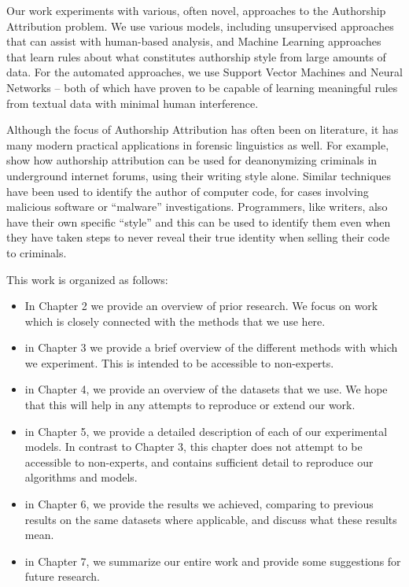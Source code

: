 Our work experiments with various, often novel, approaches to the Authorship Attribution problem. We use various models, including unsupervised approaches that can assist with human-based analysis, and Machine Learning approaches that learn rules about what constitutes authorship style from large amounts of data. For the automated approaches, we use Support Vector Machines and Neural Networks -- both of which have proven to be capable of learning meaningful rules from textual data with minimal human interference. 

Although the focus of Authorship Attribution has often been on literature, it has many modern practical applications in forensic linguistics as well. For example, \citet{afroz2014doppelganger} show how authorship attribution can be used for deanonymizing criminals in underground internet forums, using their writing style alone. Similar techniques have been used to identify the author of computer code, for cases involving malicious software or ``malware'' investigations. Programmers, like writers, also have their own specific ``style'' and this can be used to identify them even when they have taken steps to never reveal their true identity when selling their code to criminals.  

This work is organized as follows:

\begin{itemize}
    \item In Chapter 2 we provide an overview of prior research. We focus on work which is closely connected with the methods that we use here.
    \item in Chapter 3 we provide a brief overview of the different methods with which we experiment. This is intended to be accessible to non-experts.
    \item in Chapter 4, we provide an overview of the datasets that we use. We hope that this will help in any attempts to reproduce or extend our work.
    \item in Chapter 5, we provide a detailed description of each of our experimental models. In contrast to Chapter 3, this chapter does not attempt to be accessible to non-experts, and contains sufficient detail to reproduce our algorithms and models.
    \item in Chapter 6, we provide the results we achieved, comparing to previous results on the same datasets where applicable, and discuss what these results mean.
    \item in Chapter 7, we summarize our entire work and provide some suggestions for future research.
\end{itemize}

